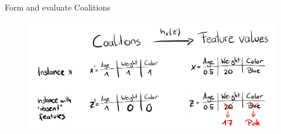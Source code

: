 \documentclass[11pt,compress,t,notes=noshow, aspectratio=169, xcolor=table]{beamer}
\begin{document}
\begin{vbframe}{Form and evaluate Coalitions}

\begin{figure}
    \centering
    \includegraphics{slides/shapley/figure_man/molnar-simplified-features.jpg}
\end{figure}

 \end{vbframe}
 
\end{document}
